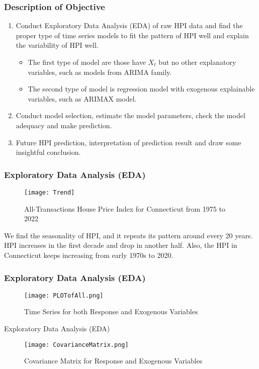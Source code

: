 \documentclass{beamer}
\begin{document}
\begin{frame}
\frametitle{Description of Objective}
\begin{enumerate}
    \item Conduct Exploratory Data Analysis (EDA) of raw HPI data and find the proper type of time series models to fit the pattern of HPI well and explain the variability of HPI well.
    \begin{itemize}
        \item The first type of model are those have ${X_t}$ but no other explanatory variables, such as models from ARIMA family.
        \item The second type of model is regression model with exogenous explainable variables, such as ARIMAX model.
    \end{itemize}
    \item Conduct model selection, estimate the model parameters, check the model adequacy and make prediction.
    \item Future HPI prediction, interpretation of prediction result and draw some insightful conclusion.
\end{enumerate}
    

\end{frame}

\begin{frame}
\frametitle{Exploratory Data Analysis (EDA)}
\begin{figure}
\centering
\texttt{[image: Trend]}
\caption{All-Transactions House Price Index for Connecticut from 1975 to 2022}
\end{figure}
We find the seasonality of HPI, and it repeats its pattern around every 20 years. HPI increases in the first decade and drop in another half. Also, the HPI in Connecticut keeps increasing from early 1970s to 2020.
\end{frame}

\begin{frame}
\frametitle{Exploratory Data Analysis (EDA)}
\begin{figure}
    \centering
    \texttt{[image: PLOTofAll.png]}
    \caption{Time Series for both Response and Exogenous Variables}
    \label{fig:my_labl}
\end{figure}

\end{frame}


\begin{frame}{Exploratory Data Analysis (EDA)}
\begin{figure} 
    \centering
    \texttt{[image: CovarianceMatrix.png]}
    \caption{Covariance Matrix for Response and Exogenous Variables}
    \label{fig:my_labl}
\end{figure}
\end{frame}
\end{document}
